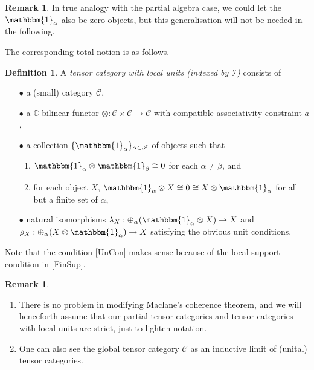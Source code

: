 \documentclass[11pt]{article}
\newcommand{\C}{\mathbb{C}}
\newcommand{\CatC}{\mathcal{C}}
\newcommand{\Unitb}{\mathbbm{1}}
\theoremstyle{definition}
\newtheorem{Def}[Theorem]{Definition}
\newtheorem{Rem}[Theorem]{Remark}
\numberwithin{equation}{section}
\begin{document}
\begin{Rem} In true analogy with the partial algebra case, we could let the $\Unitb_\alpha$ also be zero objects, but this generalisation will not be needed in the following. 
\end{Rem}

The corresponding total notion is as follows. 

\begin{Def} A \emph{tensor category with local units (indexed by $\mathscr{I}$)} consists of
\begin{itemize}
\item[$\bullet$] a (small) category $\CatC$, 
\item[$\bullet$] a $\C$-bilinear functor $\otimes: \CatC\times \CatC \rightarrow \CatC$ with compatible associativity constraint $a$, 
\item[$\bullet$]\label{FinSup} a collection $\{\Unitb_\alpha\}_{\alpha\in \mathscr{I}}$ of objects such that 
\begin{enumerate}[label=(\arabic*)] 
\item $\Unitb_\alpha\otimes \Unitb_\beta \cong 0$ for each $\alpha\neq \beta$, and
\item for each object $X$,  $\Unitb_\alpha\otimes X \cong 0 \cong X\otimes \Unitb_\alpha$ for all but a finite set of $\alpha$,
\end{enumerate}
\item[$\bullet$]\label{UnCon} natural isomorphisms $\lambda_X:\oplus_\alpha (\Unitb_\alpha\otimes X) \rightarrow X$ and $\rho_X:\oplus_\alpha(X\otimes \Unitb_\alpha)\rightarrow X$ satisfying the obvious unit conditions. 
\end{itemize} 
\end{Def}

Note that the condition \ref{UnCon} makes sense because of the local support condition in \ref{FinSup}. 

\begin{Rem} \begin{enumerate}
\item There is no problem in modifying Maclane's coherence theorem, and we will henceforth assume that our partial tensor categories and tensor categories with local units are strict, just to lighten notation. 
\item One can also see the global tensor category $\CatC$ as an inductive limit of (unital) tensor categories. 
\end{enumerate}
\end{Rem}
\end{document}
